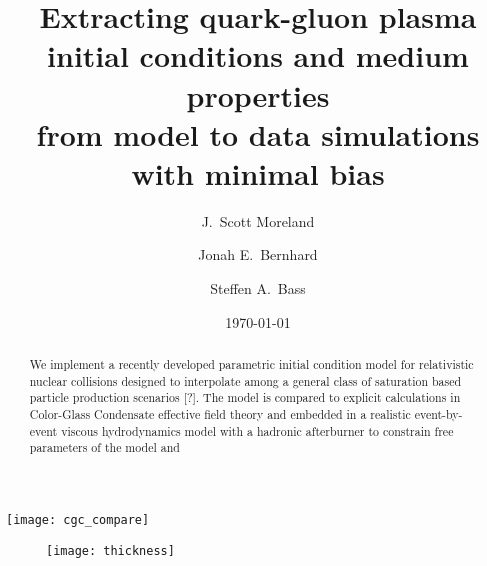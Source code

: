\documentclass[aps,prc,reprint,amsmath]{revtex4-1}
\begin{document}
\title{Extracting quark-gluon plasma initial conditions and medium properties \\ from model to data simulations with minimal bias}

\author{J.\ Scott Moreland}
\author{Jonah E.\ Bernhard}
\author{Steffen A.\ Bass}

\date{\today}


\begin{abstract}
  We implement a recently developed parametric initial condition model for relativistic nuclear collisions designed to interpolate among a general class of saturation based particle production scenarios [?]. 
  The model is compared to explicit calculations in Color-Glass Condensate effective field theory and embedded in a realistic event-by-event viscous hydrodynamics model with a hadronic afterburner to constrain free parameters of the model and  
\end{abstract}


\maketitle





\begin{figure*}
    \texttt{[image: cgc\_compare]}
\end{figure*}

\begin{figure}
    \texttt{[image: thickness]}
\end{figure}


\end{document}
